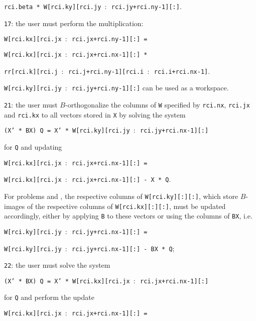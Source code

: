 \begin{description}
\begin{description}
\hspace{12mm}
{\tt rci.beta * W[rci.ky][rci.jy $:$ rci.jy+rci.ny-1][:]}.
%
\item
{\tt 17}: the user must perform the multiplication:


\hspace{8mm}
{\tt W[rci.kx][rci.jx $:$ rci.jx+rci.ny-1][:] =}

\hspace{12mm}
{\tt W[rci.kx][rci.jx $:$ rci.jx+rci.nx-1][:] *}

\hspace{16mm}
{\tt rr[rci.k][rci.j $:$ rci.j+rci.ny-1][rci.i $:$ rci.i+rci.nx-1]}.

{\tt W[rci.ky][rci.jy $:$ rci.jy+rci.ny-1][:]}
can be used as a workspace.
%
\item
{\tt 21}: 
the user must $B$-orthogonalize
the columns of {\tt W} specified by
{\tt rci.nx}, {\tt rci.jx} and {\tt rci.kx} 
to all vectors stored in {\tt X}
by solving the system

\hspace{8mm}
{\tt (X' * BX) Q = X' * W[rci.ky][rci.jy $:$ rci.jy+rci.nx-1][:]}

for {\tt Q} and updating

\hspace{8mm}
{\tt W[rci.kx][rci.jx $:$ rci.jx+rci.nx-1][:] =}

\hspace{12mm}
{\tt W[rci.kx][rci.jx $:$ rci.jx+rci.nx-1][:] - X * Q}.

For problems  and ,
the respective columns of {\tt W[rci.ky][:][:]},
which store $B$-images of the respective columns of {\tt W[rci.kx][:][:]},
must be updated
accordingly, either by applying {\tt B} to these vectors
or using the columns of {\tt BX}, i.e.

\hspace{8mm}
{\tt W[rci.ky][rci.jy $:$ rci.jy+rci.nx-1][:] =}

\hspace{12mm}
{\tt W[rci.ky][rci.jy $:$ rci.jy+rci.nx-1][:] - BX * Q};
%
\item
{\tt 22}: 
the user must solve the system

\hspace{8mm}
{\tt (X' * BX) Q = 
X' * W[rci.kx][rci.jx $:$ rci.jx+rci.nx-1][:]}

for {\tt Q}  and perform the update

\hspace{8mm}
{\tt W[rci.kx][rci.jx $:$ rci.jx+rci.nx-1][:] =}


\end{description}
\end{description}
